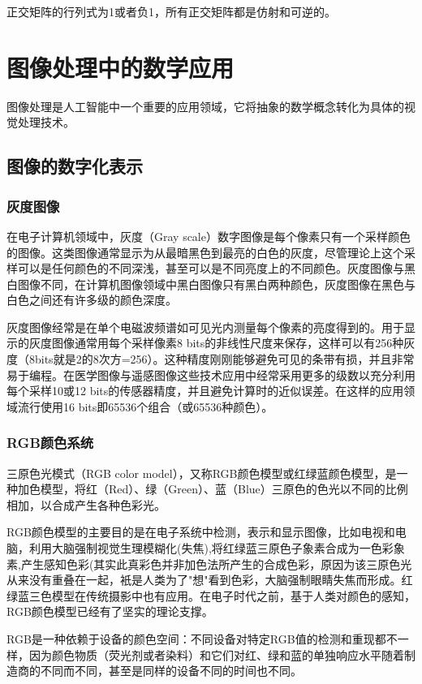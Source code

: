 正交矩阵的行列式为1或者负1，所有正交矩阵都是仿射和可逆的。

\section{图像处理中的数学应用}

图像处理是人工智能中一个重要的应用领域，它将抽象的数学概念转化为具体的视觉处理技术。

\subsection{图像的数字化表示}

\subsubsection{灰度图像}
在电子计算机领域中，灰度（Gray scale）数字图像是每个像素只有一个采样颜色的图像。这类图像通常显示为从最暗黑色到最亮的白色的灰度，尽管理论上这个采样可以是任何颜色的不同深浅，甚至可以是不同亮度上的不同颜色。灰度图像与黑白图像不同，在计算机图像领域中黑白图像只有黑白两种颜色，灰度图像在黑色与白色之间还有许多级的颜色深度。

灰度图像经常是在单个电磁波频谱如可见光内测量每个像素的亮度得到的。用于显示的灰度图像通常用每个采样像素8 bits的非线性尺度来保存，这样可以有256种灰度（8bits就是2的8次方=256）。这种精度刚刚能够避免可见的条带有损，并且非常易于编程。在医学图像与遥感图像这些技术应用中经常采用更多的级数以充分利用每个采样10或12 bits的传感器精度，并且避免计算时的近似误差。在这样的应用领域流行使用16 bits即65536个组合（或65536种颜色）。

\subsubsection{RGB颜色系统}
三原色光模式（RGB color model），又称RGB颜色模型或红绿蓝颜色模型，是一种加色模型，将红（Red）、绿（Green）、蓝（Blue）三原色的色光以不同的比例相加，以合成产生各种色彩光。

RGB颜色模型的主要目的是在电子系统中检测，表示和显示图像，比如电视和电脑，利用大脑强制视觉生理模糊化(失焦),将红绿蓝三原色子象素合成为一色彩象素,产生感知色彩(其实此真彩色并非加色法所产生的合成色彩，原因为该三原色光从来没有重叠在一起，衹是人类为了"想"看到色彩，大脑强制眼睛失焦而形成。红绿蓝三色模型在传统摄影中也有应用。在电子时代之前，基于人类对颜色的感知，RGB颜色模型已经有了坚实的理论支撑。

RGB是一种依赖于设备的颜色空间：不同设备对特定RGB值的检测和重现都不一样，因为颜色物质（荧光剂或者染料）和它们对红、绿和蓝的单独响应水平随着制造商的不同而不同，甚至是同样的设备不同的时间也不同。

